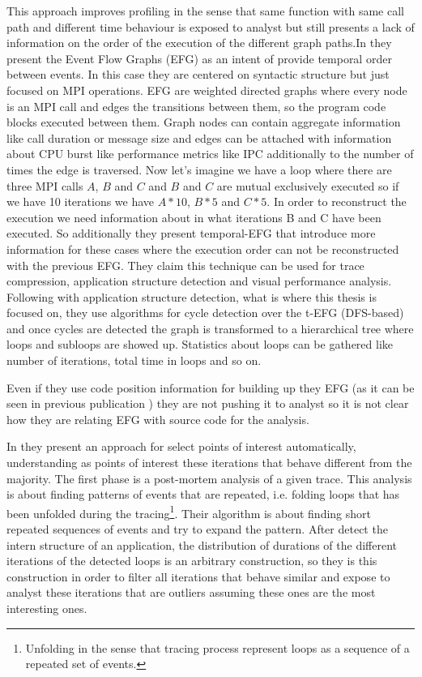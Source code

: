 \documentclass[12pt]{report}
\begin{document}
This approach improves profiling in the sense that same function with same call
path and different time behaviour is exposed to analyst but still presents a lack 
of information on the order of the execution of the different graph paths.In
\cite{aguilar2016event} they present the Event Flow Graphs (EFG) as an intent of
provide temporal order between events. In this case they are centered on
syntactic structure but just focused on MPI operations. EFG are
weighted directed graphs where every node is an MPI call and edges the
transitions between them, so the program code blocks executed between them.
Graph nodes can contain aggregate information like call duration or message size
and edges can be attached with information about CPU burst like performance
metrics like IPC additionally to the number of times the edge is traversed.
Now let's imagine we have a loop where there are three MPI calls $A$, $B$ and
$C$ and $B$ and $C$ are mutual exclusively executed so if we have 10 
iterations we have $A*10$, $B*5$ and $C*5$. In order to reconstruct the execution
we need information about in what iterations B and C have been executed.
So additionally they present temporal-EFG that introduce more
information for these cases where the execution order can not be reconstructed
with the previous EFG. They claim this technique can be used for trace
compression, application structure detection and visual performance analysis.
Following with application structure detection, what is where this thesis is
focused on, they use algorithms for cycle detection over the t-EFG (DFS-based)
and once cycles are detected the graph is transformed to a hierarchical tree
where loops and subloops are showed up. Statistics about loops can be gathered
like number of iterations, total time in loops and so on.

Even if they use code position information for building up they EFG (as it can
be seen in previous publication \cite{aguilar2014mpi}) they are not pushing it
to analyst so it is not clear how they are relating EFG with source code for the
analysis.

In \cite{trahay2015selecting} they present an approach for select points of
interest automatically, understanding as points of interest these iterations that
behave different from the majority. The first phase is a post-mortem analysis of
a given trace. This analysis is about finding patterns of events that are
repeated, i.e. folding loops that has been unfolded during the
tracing\footnote{Unfolding in the sense that tracing process represent loops as
a sequence of a repeated set of events.}. Their algorithm is about finding short
repeated sequences of events and try to expand the pattern. After detect the
intern structure of an application, the distribution of durations of the
different iterations of the detected loops is an arbitrary construction, so they
is this construction in order to filter all iterations that behave similar and
expose to analyst these iterations that are outliers assuming these ones are the
most interesting ones.
\end{document}
